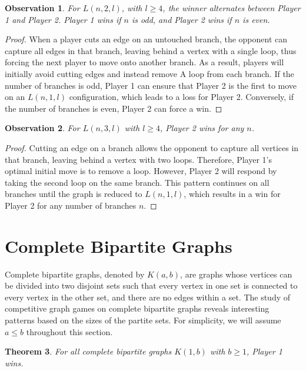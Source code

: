 \documentclass{article}
\newtheorem{theorem}{Theorem}
\newtheorem{observation}[theorem]{Observation}
\begin{document}
\begin{observation}
For $L(n, 2, l)$, with $l \geq 4$, the winner alternates between Player 1 and Player 2. Player 1 wins if $n$ is odd, and Player 2 wins if $n$ is even.
\end{observation}

\begin{proof}
When a player cuts an edge on an untouched branch, the opponent can capture all edges in that branch, leaving behind a vertex with a single loop, thus forcing the next player to move onto another branch. As a result, players will initially avoid cutting edges and instead remove A loop from each branch. If the number of branches is odd, Player 1 can ensure that Player 2 is the first to move on an $L(n, 1, l)$ configuration, which leads to a loss for Player 2. Conversely, if the number of branches is even, Player 2 can force a win.
\end{proof}

\begin{observation}
For $L(n, 3, l)$ with $l \geq 4$, Player 2 wins for any $n$.
\end{observation}

\begin{proof}
Cutting an edge on a branch allows the opponent to capture all vertices in that branch, leaving behind a vertex with two loops. Therefore, Player 1's optimal initial move is to remove a loop. However, Player 2 will respond by taking the second loop on the same branch. This pattern continues on all branches until the graph is reduced to $L(n, 1, l)$, which results in a win for Player 2 for any number of branches $n$.
\end{proof}

\section{Complete Bipartite Graphs}

Complete bipartite graphs, denoted by $K(a, b)$, are graphs whose vertices can be divided into two disjoint sets such that every vertex in one set is connected to every vertex in the other set, and there are no edges within a set. The study of competitive graph games on complete bipartite graphs reveals interesting patterns based on the sizes of the partite sets. For simplicity, we will assume $a \leq b$ throughout this section.

\begin{theorem}
For all complete bipartite graphs $K(1, b)$ with $b \geq 1$, Player 1 wins.
\end{theorem}
\end{document}

